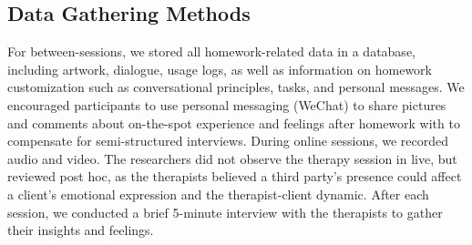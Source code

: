 
\subsection{Data Gathering Methods} 

For between-sessions, we stored all homework-related data in a database, including artwork, dialogue, usage logs, as well as information on homework customization such as conversational principles, tasks, and personal messages.
We encouraged participants to use personal messaging (WeChat) to share pictures and comments about on-the-spot experience and feelings after homework with \name{} to compensate for semi-structured interviews.
During online sessions, we recorded audio and video. 
The researchers did not observe the therapy session in live, but reviewed post hoc, as the therapists believed a third party's presence could affect a client's emotional expression and the therapist-client dynamic.
After each session, we conducted a brief 5-minute interview with the therapists to gather their insights and feelings.

